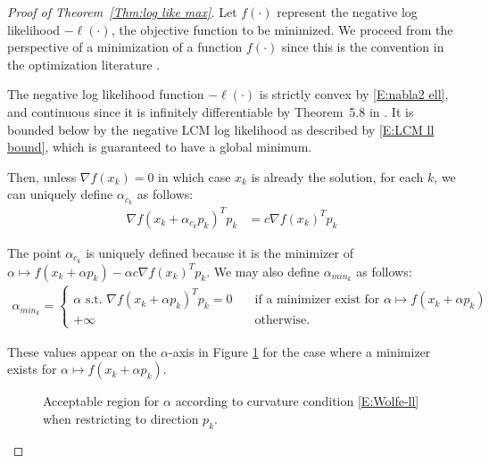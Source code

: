 \begin{proof}[Proof of Theorem~\ref{Thm:log like max}]
Let $f(\cdot)$ represent the negative log likelihood $- \ell(\cdot)$, the objective 
function to be minimized.  We proceed from the perspective of a minimization of a 
function $f(\cdot)$ since this is the convention in the optimization literature \citep
{NW,Rockafellar}.  %

The negative log likelihood function $-\ell(\cdot)$ is strictly convex by 
\eqref{E:nabla2 ell}, and continuous since it is infinitely differentiable by Theorem~5.8 in \citet{TPE2}.
It is bounded below by the negative LCM log likelihood as described by \eqref{E:LCM ll bound},
which is guaranteed to have a global minimum.

Then, unless $\nabla f( x_k ) = 0$ in which case $x_k$ is already the solution, for 
each $k$, we can uniquely define $\alpha_{c_k}$ as follows: 
\begin{align}
	\nabla f( x_k + \alpha_{c_k} p_k)^T p_k &= c \nabla f(x_k)^T p_k \label{E:alphac} 
\end{align}

The point $\alpha_{c_k}$ is uniquely defined because it is the minimizer of 
$\alpha \mapsto f( x_k + \alpha p_k) - \alpha c \nabla f( x_k )^T p_k$.
We may also define $\alpha_{min_k}$ as follows: 
\begin{align} \label{E:alphamin} 
\alpha_{min_k} =
\begin{cases}
	\alpha \text{ s.t. } \nabla f( x_k + \alpha p_k)^T p_k = 0  \quad &\text{if a minimizer exist for $\alpha \mapsto f( x_k + \alpha p_k)$}\\
	+\infty \quad &\text{otherwise}.
\end{cases}
\end{align}

These values appear on the $\alpha$-axis in Figure \ref{F:Wolfe-mod} for the case where a minimizer
exists for $\alpha \mapsto f( x_k + \alpha p_k)$.
\begin{figure}[h!]
\centering
\scalebox{.5}{}
\caption{Acceptable region for $\alpha$ according to curvature condition 
\eqref{E:Wolfe-ll} when restricting to direction $p_k$.}
\label{F:Wolfe-mod}
\end{figure}



\end{proof}
